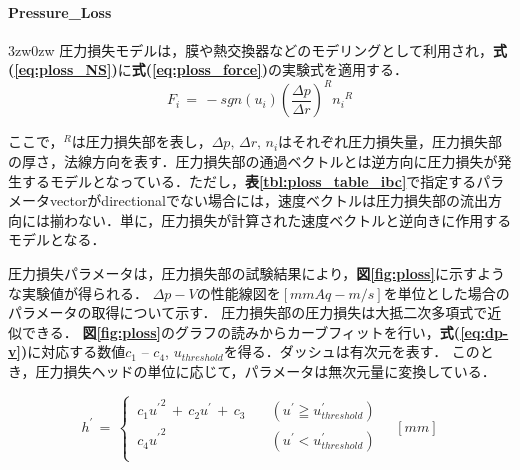 %
\paragraph{Pressure\_Loss}
\begin{indentation}{3zw}{0zw}
圧力損失モデルは，膜や熱交換器などのモデリングとして利用され，\textbf{式(\ref{eq:ploss_NS})}に\textbf{式(\ref{eq:ploss_force})}の実験式を適用する．
\begin{equation}
{F}_{i}
\,{=}\,
-sgn \left( u_{i} \right) {\left( \frac{\Delta p}{\Delta r} \right)}^{R} {n_{i}}^{R}
\label{eq:ploss_force}
\end{equation}

\noindent ここで，${}^{R}$は圧力損失部を表し，$\Delta p,\,\Delta r,\,n_{i}$はそれぞれ圧力損失量，圧力損失部の厚さ，法線方向を表す．圧力損失部の通過ベクトルとは逆方向に圧力損失が発生するモデルとなっている．ただし，\textbf{表\ref{tbl:ploss_table_ibc}}で指定するパラメータvectorがdirectionalでない場合には，速度ベクトルは圧力損失部の流出方向には揃わない．単に，圧力損失が計算された速度ベクトルと逆向きに作用するモデルとなる．

圧力損失パラメータは，圧力損失部の試験結果により，\textbf{図\ref{fig:ploss}}に示すような実験値が得られる．
$\Delta p-V$の性能線図を$[mmAq - m/s]$を単位とした場合のパラメータの取得について示す．
圧力損失部の圧力損失は大抵二次多項式で近似できる．
\textbf{図\ref{fig:ploss}}のグラフの読みからカーブフィットを行い，\textbf{式(\ref{eq:dp-v})}に対応する数値$c_{1}$ -- $c_{4}$, $u_{threshold}$を得る．ダッシュは有次元を表す．
このとき，圧力損失ヘッドの単位に応じて，パラメータは無次元量に変換している．

\begin{equation}
{h}^{\prime}
\,{=}\,
\begin{cases}
\, c_{1} {u^{\prime}}^{2}\,+\,c_{2}u^{\prime}\,+\,c_{3} & \quad (u^{\prime} \geqq u^{\prime}_{threshold})\\
\, c_{4} {u^{\prime}}^{2} & \quad (u^{\prime}<u^{\prime}_{threshold})\\
\end{cases} \quad [mm]
\label{eq:dp-v}
\end{equation}

\vspace{5mm}


\end{indentation}
